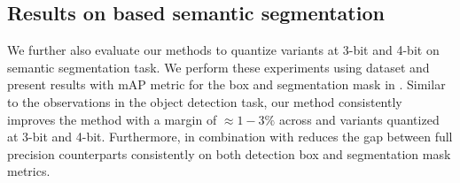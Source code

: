 \vspace{1ex}

\subsection{Results on \yolo{} based semantic segmentation}
\vspace{0.5ex}
We further also evaluate our methods to quantize \yoloa{} variants at 3-bit and 4-bit on semantic segmentation task. We perform these experiments using \coco{} dataset and present results with mAP metric for the box and segmentation mask in . Similar to the observations in the object detection task, our \qc{} method consistently improves the \exma{} method with a margin of $\approx 1-3 \%$ across  and  variants quantized at 3-bit and 4-bit. Furthermore, \qc{} in combination with \exma{} reduces the gap between full precision counterparts consistently on both detection box and segmentation mask metrics. 


